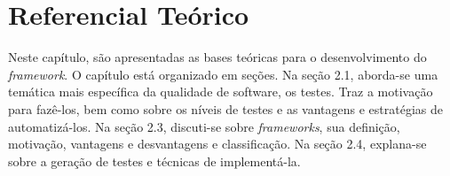 \chapter[Referencial Teórico]{Referencial Teórico}
Neste capítulo, são apresentadas as bases teóricas para o desenvolvimento do
\textit{framework}. O capítulo está organizado em seções. Na seção 2.1, 
aborda-se uma temática mais específica da qualidade de software, os testes.
Traz a motivação para fazê-los, bem como sobre os níveis de
testes e as vantagens e estratégias de automatizá-los. Na seção 2.3, discuti-se
sobre \textit{frameworks}, sua definição, motivação, vantagens e desvantagens e
classificação. Na seção 2.4, explana-se sobre a geração de testes e técnicas de
implementá-la.

